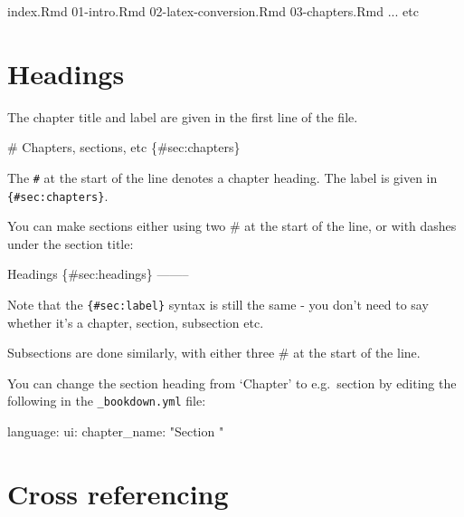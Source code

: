 \documentclass[]{book}
\newenvironment{Shaded}{\begin{snugshade}}{\end{snugshade}}
\newcommand{\BaseNTok}[1]{\textcolor[rgb]{0.00,0.00,0.81}{#1}}
\newcommand{\FunctionTok}[1]{\textcolor[rgb]{0.00,0.00,0.00}{#1}}
\newcommand{\NormalTok}[1]{#1}
\begin{document}
\begin{Shaded}
\begin{Highlighting}[]
\NormalTok{index.Rmd}
\NormalTok{01-intro.Rmd}
\NormalTok{02-latex-conversion.Rmd}
\NormalTok{03-chapters.Rmd}
\NormalTok{... etc}
\end{Highlighting}
\end{Shaded}

\hypertarget{sec:headings}{%
\section{Headings}\label{sec:headings}}

The chapter title and label are given in the first line of the file.

\begin{Shaded}
\begin{Highlighting}[]
\FunctionTok{# Chapters, sections, etc \{#sec:chapters\}}
\end{Highlighting}
\end{Shaded}

The \texttt{\#} at the start of the line denotes a chapter heading. The label is given in \texttt{\{\#sec:chapters\}}.

You can make sections either using two \# at the start of the line, or with dashes under the section title:

\begin{Shaded}
\begin{Highlighting}[]
\NormalTok{Headings \{#sec:headings\}}
\NormalTok{--------}
\end{Highlighting}
\end{Shaded}

Note that the \texttt{\{\#sec:label\}} syntax is still the same - you don't need to say whether it's a chapter, section, subsection etc.

Subsections are done similarly, with either three \# at the start of the line.

You can change the section heading from `Chapter' to e.g.~section by editing the following in the \texttt{\_bookdown.yml} file:

\begin{Shaded}
\begin{Highlighting}[]
\NormalTok{language:}
\NormalTok{  ui:}
\BaseNTok{    chapter_name: "Section "}
\end{Highlighting}
\end{Shaded}

\hypertarget{sec:cross-ref}{%
\section{Cross referencing}\label{sec:cross-ref}}
\end{document}
